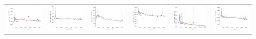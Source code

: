 \begin{center}
\begin{longtable}{l l l l l l }
    \includegraphics[width=0.3\linewidth, clip]{Figs/Figs-sdss/spec-6780-56577-0280-STRIPE82-0053-044359.pdf} & \includegraphics[width=0.3\linewidth, clip]{Figs/Figs-sdss/spec-6781-56274-0268-STRIPE82-0057-039669.pdf} & \includegraphics[width=0.3\linewidth, clip]{Figs/Figs-sdss/spec-6781-56274-0387-STRIPE82-0055-012470.pdf} & \includegraphics[width=0.3\linewidth, clip]{Figs/Figs-sdss/spec-6781-56274-0507-STRIPE82-0056-011736.pdf} & \includegraphics[width=0.3\linewidth, clip]{Figs/Figs-sdss/spec-6781-56599-0575-STRIPE82-0056-038512.pdf} & \includegraphics[width=0.3\linewidth, clip]{Figs/Figs-sdss/spec-6782-56572-0334-STRIPE82-0059-014841.pdf} \\

\end{longtable}
\end{center}
